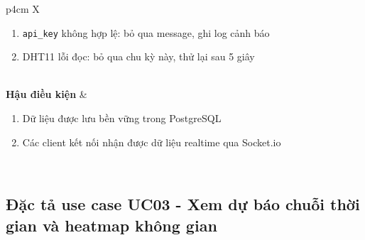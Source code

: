 \begin{table}[H]
\begin{tabularx}{\textwidth}{p{4cm} X}
\begin{minipage}[t]{\linewidth}
\begin{enumerate}[leftmargin=*, topsep=0pt]
          \item[4a.] \texttt{api\_key} không hợp lệ: bỏ qua message,
            ghi log cảnh báo
          \item[1a.] DHT11 lỗi đọc: bỏ qua chu kỳ này, thử lại sau
            5 giây
        \end{enumerate}
      \end{minipage} \\
    \textbf{Hậu điều kiện} &
      \begin{minipage}[t]{\linewidth}
        \begin{enumerate}[leftmargin=*, topsep=0pt]
          \item Dữ liệu được lưu bền vững trong PostgreSQL
          \item Các client kết nối nhận được dữ liệu realtime qua
            Socket.io
        \end{enumerate}
      \end{minipage} \\
    \bottomrule
  \end{tabularx}
\end{table}

\subsection{Đặc tả use case UC03 - Xem dự báo chuỗi thời gian và
heatmap không gian}
\label{subsec:survey:uc03}

